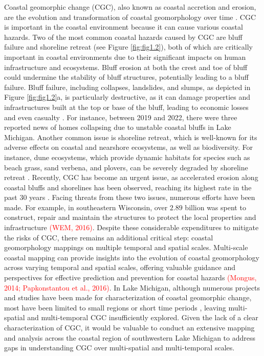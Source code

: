 Coastal geomorphic change (CGC), also known as coastal accretion and erosion, are the evolution and transformation of coastal geomorphology over time \citep{biswas_effects_2023}. CGC is important in the coastal environment because it can cause various coastal hazards. Two of the most common coastal hazards caused by CGC are bluff failure and shoreline retreat (see Figure \ref{fig:fig1.2}), both of which are critically important in coastal environments due to their significant impacts on human infrastructure and ecosystems. Bluff erosion at both the crest and toe of bluff could undermine the stability of bluff structures, potentially leading to a bluff failure. Bluff failure, including collapses, landslides, and slumps, as depicted in Figure \ref{fig:fig1.2}a, is particularly destructive, as it can damage properties and infrastructures built at the top or base of the bluff, leading to economic losses and even casualty \citep{deitz_bluff_2024}. For instance, between 2019 and 2022, there were three reported news \citep{mitchell_geologist_2019,fromson_house_2020,koran_15_2022} of homes collapsing due to unstable coastal bluffs in Lake Michigan. Another common issue is shoreline retreat, which is well-known for its adverse effects on coastal and nearshore ecosystems, as well as biodiversity. For instance, dune ecosystems, which provide dynamic habitats for species such as beach grass, sand verbena, and plovers, can be severely degraded by shoreline retreat \citep{van_der_biest_dune_2017}. Recently, CGC has become an urgent issue, as accelerated erosion along coastal bluffs and shorelines has been observed, reaching its highest rate in the past 30 years \citep{troy_rapid_2021,zoet_analysis_2017,gronewold_hydrological_2016}. Facing threats from these two issues, numerous efforts have been made. For example, in southeastern Wisconsin, over $2.89$ billion was spent to construct, repair and maintain the structures to protect the local properties and infrastructure \textcolor{red}{(WEM, 2016)}. Despite these considerable expenditures to mitigate the risks of CGC, there remains an additional critical step: coastal geomorphology mappings on multiple temporal and spatial scales. Multi-scale coastal mapping can provide insights into the evolution of coastal geomorphology across varying temporal and spatial scales, offering valuable guidance and perspectives for effective prediction and prevention for coastal hazards \textcolor{red}{(Mongus, 2014; Papkonstantou et al., 2016)}. In Lake Michigan, although numerous projects and studies have been made for characterization of coastal geomorphic change, most have been limited to small regions \citep[\eg][]{swenson_bluff_2006,kilibarda_70year_2015} or short time periods \citep[\eg][]{lin_field_2014,theuerkauf_coastal_2019}, leaving multi-spatial and multi-temporal CGC insufficiently explored. Given the lack of a clear characterization of CGC, it would be valuable to conduct an extensive mapping and analysis across the coastal region of southwestern Lake Michigan to address gaps in understanding CGC over multi-spatial and multi-temporal scales.


